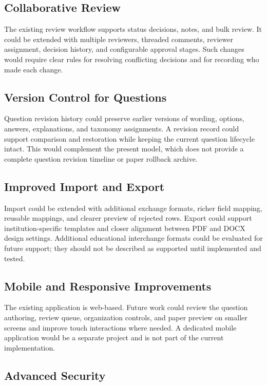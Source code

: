 \subsection{Collaborative Review}

The existing review workflow supports status decisions, notes, and bulk review. It could be extended with multiple reviewers, threaded comments, reviewer assignment, decision history, and configurable approval stages. Such changes would require clear rules for resolving conflicting decisions and for recording who made each change.

\subsection{Version Control for Questions}

Question revision history could preserve earlier versions of wording, options, answers, explanations, and taxonomy assignments. A revision record could support comparison and restoration while keeping the current question lifecycle intact. This would complement the present model, which does not provide a complete question revision timeline or paper rollback archive.

\subsection{Improved Import and Export}

Import could be extended with additional exchange formats, richer field mapping, reusable mappings, and clearer preview of rejected rows. Export could support institution-specific templates and closer alignment between PDF and DOCX design settings. Additional educational interchange formats could be evaluated for future support; they should not be described as supported until implemented and tested.

\subsection{Mobile and Responsive Improvements}

The existing application is web-based. Future work could review the question authoring, review queue, organization controls, and paper preview on smaller screens and improve touch interactions where needed. A dedicated mobile application would be a separate project and is not part of the current implementation.

\subsection{Advanced Security}

